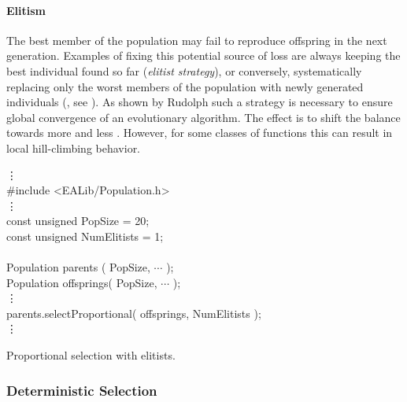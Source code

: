         \paragraph{Elitism}

The best member of the population may fail to reproduce offspring in
the next generation.  Examples of fixing this potential source of loss
are always keeping the best individual found so far (\emph{elitist
strategy}), or conversely, systematically replacing only the worst
members of the population with newly generated individuals
(\emph{}, see
).  As shown by
Rudolph \cite{Rudolph:94} such a strategy is necessary to ensure
global convergence of an evolutionary algorithm.  The effect is to
shift the balance towards more  and less
.
However, for some classes of functions this can result in local
hill-climbing behavior.

\begin{example}[htb]
\begin{shortlisting}
            \vdots\\
\#include <EALib/Population.h>\\
            \vdots\\
const unsigned PopSize     = 20;\\
const unsigned NumElitists = 1;\\
\\
Population parents   ( PopSize, $\cdots$ );\\
Population offsprings( PopSize, $\cdots$ );\\
            \vdots\\
parents.selectProportional( offsprings, NumElitists );\\
            \vdots\\
\end{shortlisting}
\vspace{-10pt}\caption[Proportional Selection with Elitists]{
    Proportional selection with elitists.
}
\end{example}



        \subsubsection{Deterministic Selection}
        \label{selection:subsubs:deterministicSelection}


